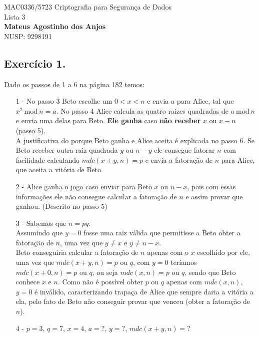 \documentclass[12pt]{article}
\newcommand{\modd}{\ \text{mod}\ }
\begin{document}
	\begin{center}
		{\Large MAC0336/5723 Criptografia para Segurança de Dados\\
		Lista 3}\\
		\textbf{Mateus Agostinho dos Anjos}\\
		NUSP: 9298191
	\end{center}

	\vspace{0.4 cm}
	
	\subsection*{Exercício 1.}
		Dado os passos de 1 a 6 na página 182 temos:
		\begin{itemize}			
			\item[1 -]
				No passo 3 Beto escolhe um $0 < x < n$ e envia $a$ para
				Alice, tal que $x^2 \modd n = a$. No passo 4 Alice calcula as 
				quatro raízes quadradas de $a \modd n$ e envia uma delas 
				para Beto. \textbf{Ele ganha} caso \textbf{não receber} $x$ ou 
				$x - n$ (passo 5).\\
				A justificativa do porque Beto ganha e Alice aceita é explicada
				no passo 6. Se Beto receber outra raiz quadrada $y$ ou
				$n - y$ ele consegue fatorar $n$ com facilidade calculando
				$mdc(x+y, n) = p$ e envia a fatoração de $n$ para Alice, que
				aceita a vitória de Beto.
			\item[2 -]
				Alice ganha o jogo caso enviar para Beto $x$ ou $n - x$, pois
				com essas informações ele não consegue calcular a fatoração
				de $n$ e assim provar que ganhou. (Descrito no passo 5)
			\item[3 -]
				Sabemos que $n = pq$.\\		
				Assumindo que $y = 0$ fosse uma raiz válida que permitisse
				a Beto obter a fatoração de $n$, uma vez que $y \neq x$ e
				$y \neq n - x$.\\
				Beto conseguiria calcular a fatoração de $n$ apenas com
				o $x$ escolhido por ele, uma vez que $mdc(x+y, n) = p$ ou $q$, 
				com $y = 0$ teríamos $mdc(x+0, n) = p$ ou $q$, ou
				seja $mdc(x, n) = p$ ou $q$, sendo que Beto conhece $x$ e $n$.
				Como não é possível obter $p$ ou $q$ apenas com $mdc(x, n)$,
				$y = 0$ é inválido, caracterizando trapaça de Alice que sempre daria a
				vitória a ela, pelo fato de Beto não conseguir provar que venceu 
				(obter a fatoração de $n$).
			\item[4 -]
				$p = 3$, $q = 7$, $x = 4$, $a = ?$, $y = ?$, $mdc(x + y, n) = ?$\\

\end{itemize}
\end{document}
